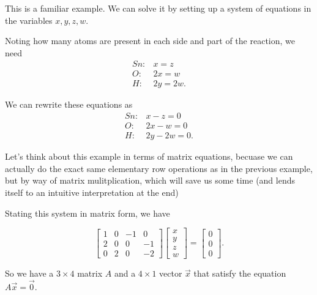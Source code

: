 \documentclass{ximera}
\begin{document}
\begin{exploration}
\begin{example}

This is a familiar example. We can solve it by setting up a system of
equations in the variables $x,y,z,w$. 

Noting how many atoms are present in each side and part of the reaction, we need
\begin{equation*}
  \begin{array}{cl}
    Sn: & x=z \\
    O: & 2x=w \\
    H: & 2y=2w.
  \end{array}
\end{equation*}

We can rewrite these equations as
\begin{equation*}
  \begin{array}{cl}
    Sn: & x - z = 0 \\
    O: & 2x - w = 0 \\
    H: & 2y - 2w = 0.
  \end{array}
\end{equation*}

Let's think about this example in terms of matrix equations, becuase we can actually do the exact same elementary row operations as in the previous example, but by way of matrix mulitplication, which will save us some time (and lends itself to an intuitive interpretation at the end)

Stating this system in matrix form, we have

\begin{equation*}
  \begin{bmatrix}
    1 & 0 & -1 & 0 \\
    2 & 0 & 0 & -1 \\
    0 & 2 & 0 & -2
  \end{bmatrix}
  \begin{bmatrix}
    x \\
    y \\
    z \\
    w
  \end{bmatrix}
  =
  \begin{bmatrix}
    0 \\
    0 \\
    0
  \end{bmatrix}.
\end{equation*}

So we have a $3\times 4$ matrix $A$ and a $4\times 1$ vector $\vec{x}$ that satisfy the equation $A\vec{x} = \vec{0}$.


\end{example}
\end{exploration}
\end{document}
